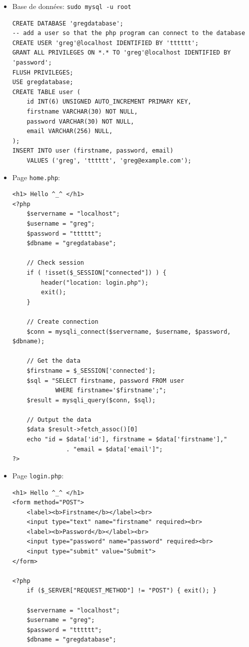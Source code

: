 \documentclass[a4paper]{article}
\begin{document}
\begin{itemize}


\item Base de données: \texttt{sudo mysql -u root}
\begin{lstlisting}[style=sql]
CREATE DATABASE 'gregdatabase';
-- add a user so that the php program can connect to the database
CREATE USER 'greg'@localhost IDENTIFIED BY 'tttttt';
GRANT ALL PRIVILEGES ON *.* TO 'greg'@localhost IDENTIFIED BY 'password';
FLUSH PRIVILEGES;
USE gregdatabase;
CREATE TABLE user (
    id INT(6) UNSIGNED AUTO_INCREMENT PRIMARY KEY,
    firstname VARCHAR(30) NOT NULL,
    password VARCHAR(30) NOT NULL,
    email VARCHAR(256) NULL,
);
INSERT INTO user (firstname, password, email)
    VALUES ('greg', 'tttttt', 'greg@example.com');
\end{lstlisting}


\item Page \texttt{home.php}:
\begin{lstlisting}[style=php]
<h1> Hello ^_^ </h1>
<?php
    $servername = "localhost";
    $username = "greg";
    $password = "tttttt";
    $dbname = "gregdatabase";

    // Check session
    if ( !isset($_SESSION["connected"]) ) {
        header("location: login.php");
        exit();
    }

    // Create connection
    $conn = mysqli_connect($servername, $username, $password, $dbname);

    // Get the data
    $firstname = $_SESSION['connected'];
    $sql = "SELECT firstname, password FROM user
            WHERE firstname='$firstname';";
    $result = mysqli_query($conn, $sql);

    // Output the data
    $data $result->fetch_assoc()[0]
    echo "id = $data['id'], firstname = $data['firstname'],"
               . "email = $data['email']";
?>
\end{lstlisting}


\item Page \texttt{login.php}:
\begin{lstlisting}[style=php]
<h1> Hello ^_^ </h1>
<form method="POST">
    <label><b>Firstname</b></label><br>
    <input type="text" name="firstname" required><br>
    <label><b>Password</b></label><br>
    <input type="password" name="password" required><br>
    <input type="submit" value="Submit">
</form>

<?php
    if ($_SERVER["REQUEST_METHOD"] != "POST") { exit(); }

    $servername = "localhost";
    $username = "greg";
    $password = "tttttt";
    $dbname = "gregdatabase";


\end{lstlisting}
\end{itemize}
\end{document}
